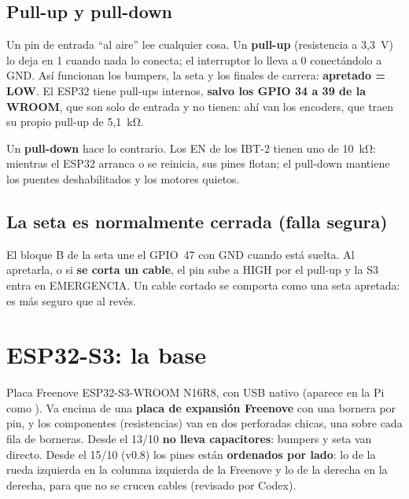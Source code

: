 \subsection{Pull-up y pull-down}
Un pin de entrada ``al aire'' lee cualquier cosa. Un \textbf{pull-up} (resistencia a 3,3~V) lo deja en 1 cuando nada
lo conecta; el interruptor lo lleva a 0 conectándolo a GND. Así funcionan los bumpers, la seta y los finales de
carrera: \textbf{apretado = LOW}. El ESP32 tiene pull-ups internos, \textbf{salvo los GPIO 34 a 39 de la WROOM}, que
son solo de entrada y no tienen: ahí van los encoders, que traen su propio pull-up de 5,1~kΩ.

Un \textbf{pull-down} hace lo contrario. Los EN de los IBT-2 tienen uno de 10~kΩ: mientras el ESP32 arranca o se
reinicia, sus pines flotan; el pull-down mantiene los puentes deshabilitados y los motores quietos.

\subsection{La seta es normalmente cerrada (falla segura)}
El bloque B de la seta une el GPIO~47 con GND cuando está suelta. Al apretarla, o si \textbf{se corta un cable}, el pin
sube a HIGH por el pull-up y la S3 entra en EMERGENCIA. Un cable cortado se comporta como una seta apretada: es más
seguro que al revés.

\section{ESP32-S3: la base}

Placa Freenove ESP32-S3-WROOM N16R8, con USB nativo (aparece en la Pi como ). Va encima de una
\textbf{placa de expansión Freenove} con una bornera por pin, y los componentes (resistencias) van en dos perforadas
chicas, una sobre cada fila de borneras. Desde el 13/10 \textbf{no lleva capacitores}: bumpers y seta van directo.
Desde el 15/10 (v0.8) los pines están \textbf{ordenados por lado}: lo de la rueda izquierda en la columna izquierda
de la Freenove y lo de la derecha en la derecha, para que no se crucen cables (revisado por Codex).

